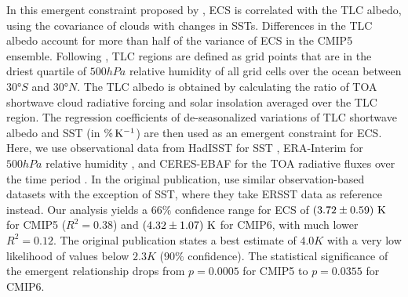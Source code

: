 In this emergent constraint proposed by \textcite{Brient2016}, \ac{ECS} is
correlated with the \ac{TLC} albedo, \ie{} using the covariance of clouds with
changes in \acp{SST}. Differences in the \ac{TLC} albedo account for more than
half of the variance of \ac{ECS} in the \acs{CMIP}5 ensemble. Following
\textcite{Brient2016}, \ac{TLC} regions are defined as grid points that are in
the driest quartile of $500 \unit{hPa}$ relative humidity of all grid cells
over the ocean between $30 \unit{\degree S}$ and $30 \unit{\degree N}$. The
\ac{TLC} albedo is obtained by calculating the ratio of \ac{TOA} shortwave
cloud radiative forcing and solar insolation averaged over the \ac{TLC} region.
The regression coefficients of de-seasonalized variations of \ac{TLC} shortwave
albedo and \ac{SST} (in $\si{\pctK{}}$) are then used as an emergent constraint
for \ac{ECS}. Here, we use observational data from HadISST for \ac{SST}
\autocite{Rayner2003}, ERA-Interim for $500 \unit{hPa}$ relative humidity
\autocite{Dee2011}, and CERES-EBAF \autocite{Loeb2018} for the \ac{TOA}
radiative fluxes over the time period . In the original
publication, \textcite{Brient2016} use similar observation-based datasets with
the exception of \ac{SST}, where they take ERSST data \autocite{Smith2003} as
reference instead. Our analysis yields a $66 \unit{\%}$ confidence range for
\ac{ECS} of $\pmrangeunit{3.72}{0.59}{K}$ for \acs{CMIP}5 ($R^2 = 0.38$) and
$\pmrangeunit{4.32}{1.07}{K}$ for \acs{CMIP}6, with much lower $R^2 = 0.12$.
The original publication states a best estimate of $4.0 \unit{K}$ with a very
low likelihood of values below $2.3 \unit{K}$ ($90 \unit{\%}$ confidence). The
statistical significance of the emergent relationship drops from $p = 0.0005$
for \acs{CMIP}5 to $p = 0.0355$ for \acs{CMIP}6.

